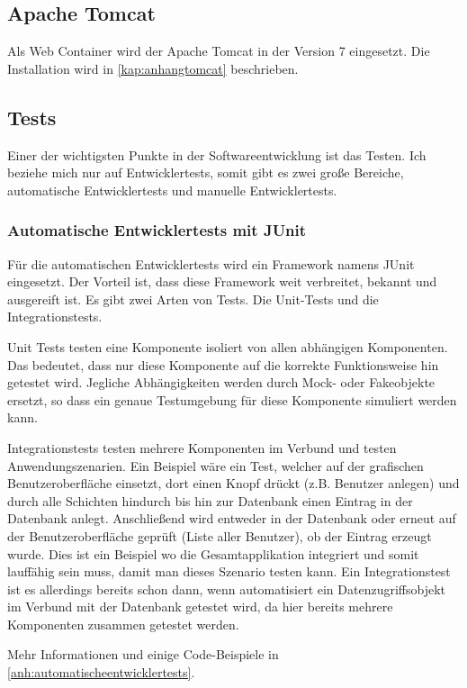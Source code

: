 \subsection{Apache Tomcat}
Als Web Container wird der \gls{Apache Tomcat} in der Version 7 eingesetzt. Die Installation wird in 
\autoref{kap:anhangtomcat} beschrieben. 
 
\subsection{Tests}

Einer der wichtigsten Punkte in der Softwareentwicklung ist das Testen. Ich beziehe mich nur auf Entwicklertests, somit gibt es zwei große Bereiche, automatische Entwicklertests und manuelle Entwicklertests. 

\subsubsection{Automatische Entwicklertests mit JUnit}

Für die automatischen Entwicklertests wird ein Framework namens JUnit eingesetzt. Der Vorteil ist, dass diese Framework weit verbreitet, bekannt und ausgereift ist. 
Es gibt zwei Arten von Tests. Die Unit-Tests und die Integrationstests. 

Unit Tests testen eine Komponente isoliert von allen abhängigen Komponenten. Das bedeutet, dass nur diese Komponente auf die korrekte Funktionsweise hin getestet wird. Jegliche Abhängigkeiten werden durch Mock- oder Fakeobjekte ersetzt, so dass ein genaue Testumgebung für diese Komponente simuliert werden kann. 

Integrationstests testen mehrere Komponenten im Verbund und testen Anwendungszenarien. Ein Beispiel wäre ein Test, welcher auf der grafischen Benutzeroberfläche einsetzt, dort einen Knopf drückt (z.B. Benutzer anlegen) und durch alle Schichten hindurch bis hin zur Datenbank einen Eintrag in der Datenbank anlegt. Anschließend wird entweder in der Datenbank oder erneut auf der Benutzeroberfläche geprüft (Liste aller Benutzer), ob der Eintrag erzeugt wurde. 
Dies ist ein Beispiel wo die Gesamtapplikation integriert und somit lauffähig sein muss, damit man dieses Szenario testen kann. 
Ein Integrationstest ist es allerdings bereits schon dann, wenn automatisiert ein Datenzugriffsobjekt im Verbund mit der Datenbank getestet wird, da hier bereits mehrere Komponenten zusammen getestet werden. 

Mehr Informationen und einige Code-Beispiele in \autoref{anh:automatischeentwicklertests}.

